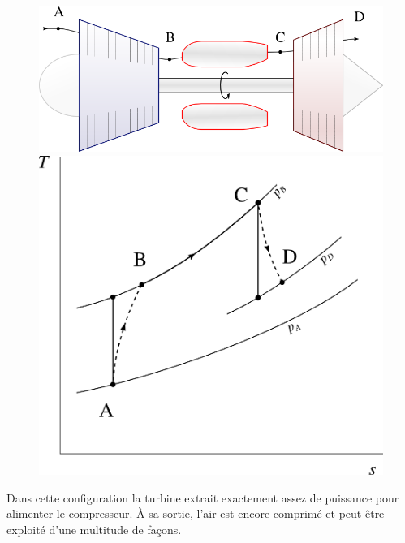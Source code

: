 {{		\begin{figure}
			\begin{center}
				\includegraphics[scale=0.6]{images/circuit_generateur_gaz.png}\vspace{0.5cm}
				\includegraphics[scale=0.8]{images/ts_gp_generateur_gaz.png}
			\end{center}
			\label{fig_générateur_gaz}
		\end{figure}

		Dans cette configuration la turbine extrait exactement assez de puissance pour alimenter le compresseur. À sa sortie, l’air est encore comprimé et peut être exploité d’une multitude de façons.



}}
